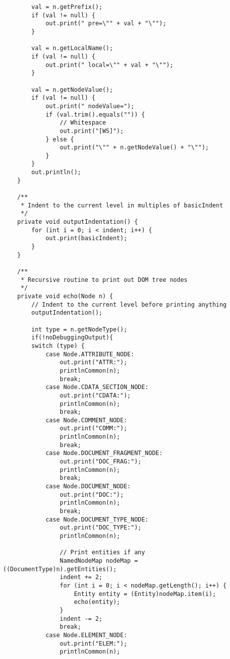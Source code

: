 \documentclass[11pt,english]{article}
\begin{document}
\begin{enumerate}
\begin{lstlisting}
        val = n.getPrefix();
        if (val != null) {
            out.print(" pre=\"" + val + "\"");
        }

        val = n.getLocalName();
        if (val != null) {
            out.print(" local=\"" + val + "\"");
        }

        val = n.getNodeValue();
        if (val != null) {
            out.print(" nodeValue=");
            if (val.trim().equals("")) {
                // Whitespace
                out.print("[WS]");
            } else {
                out.print("\"" + n.getNodeValue() + "\"");
            }
        }
        out.println();
    }

    /**
     * Indent to the current level in multiples of basicIndent
     */
    private void outputIndentation() {
        for (int i = 0; i < indent; i++) {
            out.print(basicIndent);
        }
    }

    /**
     * Recursive routine to print out DOM tree nodes
     */
    private void echo(Node n) {
        // Indent to the current level before printing anything
        outputIndentation();

        int type = n.getNodeType();
        if(!noDebuggingOutput){
        switch (type) {
            case Node.ATTRIBUTE_NODE:
                out.print("ATTR:");
                printlnCommon(n);
                break;
            case Node.CDATA_SECTION_NODE:
                out.print("CDATA:");
                printlnCommon(n);
                break;
            case Node.COMMENT_NODE:
                out.print("COMM:");
                printlnCommon(n);
                break;
            case Node.DOCUMENT_FRAGMENT_NODE:
                out.print("DOC_FRAG:");
                printlnCommon(n);
                break;
            case Node.DOCUMENT_NODE:
                out.print("DOC:");
                printlnCommon(n);
                break;
            case Node.DOCUMENT_TYPE_NODE:
                out.print("DOC_TYPE:");
                printlnCommon(n);

                // Print entities if any
                NamedNodeMap nodeMap = ((DocumentType)n).getEntities();
                indent += 2;
                for (int i = 0; i < nodeMap.getLength(); i++) {
                    Entity entity = (Entity)nodeMap.item(i);
                    echo(entity);
                }
                indent -= 2;
                break;
            case Node.ELEMENT_NODE:
                out.print("ELEM:");
                printlnCommon(n);


\end{lstlisting}
\end{enumerate}
\end{document}
